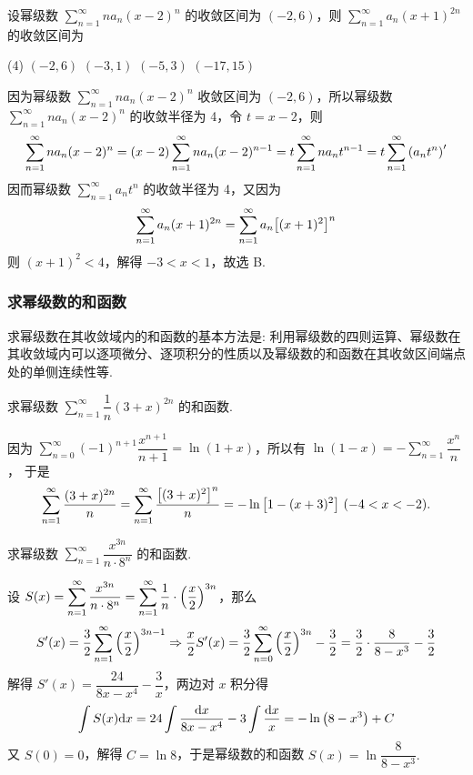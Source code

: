 \begin{example}[2020 数三]
    设幂级数 $\displaystyle\sum_{n=1}^{\infty}na_n(x-2)^n$ 的收敛区间为 $(-2,6)$，则 $\displaystyle\sum_{n=1}^{\infty}a_n(x+1)^{2n}$ 的收敛区间为
    \begin{tasks}(4)
        \task $(-2,6)$
        \task $(-3,1)$
        \task $(-5,3)$
        \task $(-17,15)$
    \end{tasks}
\end{example}
\begin{solution}
    因为幂级数 $\displaystyle\sum_{n=1}^{\infty}na_n(x-2)^n$ 收敛区间为 $(-2,6)$，所以幂级数 $\displaystyle\sum_{n=1}^{\infty}na_n(x-2)^n$ 的收敛半径为 4，令 $t=x-2$，则
    $$\sum_{n=1}^{\infty}na_n(x-2)^n=(x-2)\sum_{n=1}^{\infty}na_n(x-2)^{n-1}=t\sum_{n=1}^{\infty}na_nt^{n-1}=t\sum_{n=1}^{\infty}\qty(a_nt^n)'$$
    因而幂级数 $\displaystyle\sum_{n=1}^{\infty}a_nt^n$ 的收敛半径为 4，又因为 $$\sum_{n=1}^{\infty}a_n(x+1)^{2n}=\sum_{n=1}^{\infty}a_n\qty[(x+1)^2]^n$$
    则 $(x+1)^2<4$，解得 $-3<x<1$，故选 B.
\end{solution}

\subsubsection{求幂级数的和函数}

求幂级数在其收敛域内的和函数的基本方法是: 利用幂级数的四则运算、幂级数在其收敛域内可以逐项微分、逐项积分的性质以及幂级数的和函数在其收敛区间端点处的单侧连续性等.

\begin{example}
    求幂级数 $\displaystyle\sum_{n=1}^{\infty}\dfrac{1}{n}(3+x)^{2n}$ 的和函数.
\end{example}
\begin{solution}
    因为 $\displaystyle \sum_{n=0}^{\infty}(-1)^{n+1}\dfrac{x^{n+1}}{n+1}=\ln(1+x)$，所以有
    $\displaystyle\ln(1-x)=-\sum_{n=1}^{\infty}\dfrac{x^n}{n}$，
    于是 $$\displaystyle\sum_{n=1}^{\infty}\dfrac{(3+x)^{2n}}{n}=\sum_{n=1}^{\infty}\dfrac{\qty[(3+x)^{2}]^{n}}{n}=-\ln\qty[1-(x+3)^2]~ (-4<x<-2).$$
\end{solution}

\begin{example}
    求幂级数 $\displaystyle\sum_{n=1}^{\infty}\dfrac{x^{3n}}{n\cdot 8^n}$ 的和函数.
\end{example}
\begin{solution}
    设 $S(x)=\displaystyle\sum_{n=1}^{\infty}\dfrac{x^{3n}}{n\cdot 8^n}=\sum_{n=1}^{\infty}\dfrac{1}{n}\cdot\qty(\dfrac{x}{2})^{3n}$，那么
    $$S'(x)=\dfrac{3}{2}\sum_{n=1}^{\infty}\qty(\dfrac{x}{2})^{3n-1}\Rightarrow \dfrac{x}{2}S'(x)=\dfrac{3}{2}\sum_{n=0}^{\infty}\qty(\dfrac{x}{2})^{3n}-\dfrac{3}{2}=\dfrac{3}{2}\cdot\dfrac{8}{8-x^3}-\dfrac{3}{2}$$
    解得 $S'(x)=\dfrac{24}{8x-x^4}-\dfrac{3}{x}$，两边对 $x$ 积分得
    $$\int S(x)\dd x=24\int\dfrac{\dd x}{8x-x^4}-3\int\dfrac{\dd x}{x}=-\ln\qty(8-x^3)+C$$
    又 $S(0)=0$，解得 $C=\ln8$，于是幂级数的和函数 $S(x)=\ln\dfrac{8}{8-x^3}.$
\end{solution}

